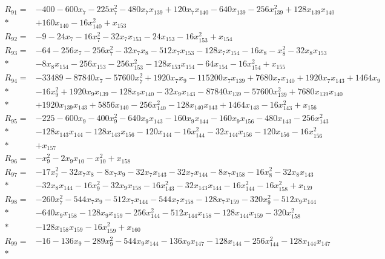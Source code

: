 \begin{align*}
R_{91}={}&-400-600x_{7}-225x_{7}^{2}-480x_{7}x_{139}+120x_{7}x_{140}-640x_{139}-256x_{139}^{2}+128x_{139}x_{140}\\*
&+160x_{140}-16x_{140}^{2}+x_{153}\\[3pt]
R_{92}={}&-9-24x_{7}-16x_{7}^{2}-32x_{7}x_{153}-24x_{153}-16x_{153}^{2}+x_{154}\\[3pt]
R_{93}={}&-64-256x_{7}-256x_{7}^{2}-32x_{7}x_{8}-512x_{7}x_{153}-128x_{7}x_{154}-16x_{8}-x_{8}^{2}-32x_{8}x_{153}\\*
&-8x_{8}x_{154}-256x_{153}-256x_{153}^{2}-128x_{153}x_{154}-64x_{154}-16x_{154}^{2}+x_{155}\\[3pt]
R_{94}={}&-33489-87840x_{7}-57600x_{7}^{2}+1920x_{7}x_{9}-115200x_{7}x_{139}+7680x_{7}x_{140}+1920x_{7}x_{143}+1464x_{9}\\*
&-16x_{9}^{2}+1920x_{9}x_{139}-128x_{9}x_{140}-32x_{9}x_{143}-87840x_{139}-57600x_{139}^{2}+7680x_{139}x_{140}\\*
&+1920x_{139}x_{143}+5856x_{140}-256x_{140}^{2}-128x_{140}x_{143}+1464x_{143}-16x_{143}^{2}+x_{156}\\[3pt]
R_{95}={}&-225-600x_{9}-400x_{9}^{2}-640x_{9}x_{143}-160x_{9}x_{144}-160x_{9}x_{156}-480x_{143}-256x_{143}^{2}\\*
&-128x_{143}x_{144}-128x_{143}x_{156}-120x_{144}-16x_{144}^{2}-32x_{144}x_{156}-120x_{156}-16x_{156}^{2}\\*
&+x_{157}\\[3pt]
R_{96}={}&-x_{9}^{2}-2x_{9}x_{10}-x_{10}^{2}+x_{158}\\[3pt]
R_{97}={}&-17x_{7}^{2}-32x_{7}x_{8}-8x_{7}x_{9}-32x_{7}x_{143}-32x_{7}x_{144}-8x_{7}x_{158}-16x_{8}^{2}-32x_{8}x_{143}\\*
&-32x_{8}x_{144}-16x_{9}^{2}-32x_{9}x_{158}-16x_{143}^{2}-32x_{143}x_{144}-16x_{144}^{2}-16x_{158}^{2}+x_{159}\\[3pt]
R_{98}={}&-260x_{7}^{2}-544x_{7}x_{9}-512x_{7}x_{144}-544x_{7}x_{158}-128x_{7}x_{159}-320x_{9}^{2}-512x_{9}x_{144}\\*
&-640x_{9}x_{158}-128x_{9}x_{159}-256x_{144}^{2}-512x_{144}x_{158}-128x_{144}x_{159}-320x_{158}^{2}\\*
&-128x_{158}x_{159}-16x_{159}^{2}+x_{160}\\[3pt]
R_{99}={}&-16-136x_{9}-289x_{9}^{2}-544x_{9}x_{144}-136x_{9}x_{147}-128x_{144}-256x_{144}^{2}-128x_{144}x_{147}\\*

\end{align*}
